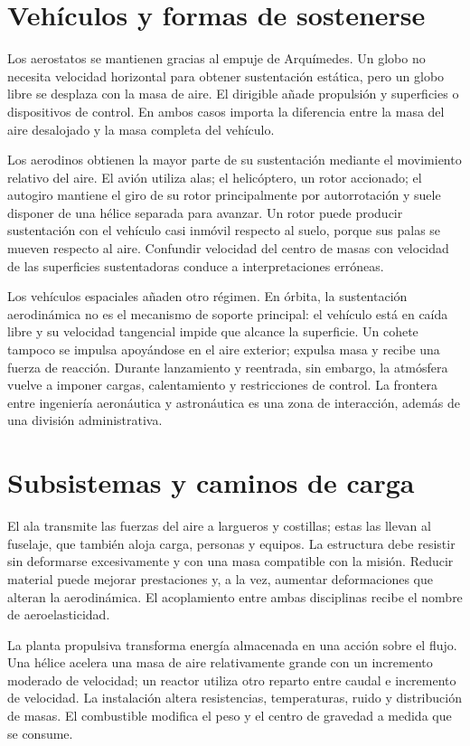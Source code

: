 \section{Vehículos y formas de sostenerse}
Los aerostatos se mantienen gracias al empuje de Arquímedes. Un globo no necesita velocidad horizontal para obtener sustentación estática, pero un globo libre se desplaza con la masa de aire. El dirigible añade propulsión y superficies o dispositivos de control. En ambos casos importa la diferencia entre la masa del aire desalojado y la masa completa del vehículo.

Los aerodinos obtienen la mayor parte de su sustentación mediante el movimiento relativo del aire. El avión utiliza alas; el helicóptero, un rotor accionado; el autogiro mantiene el giro de su rotor principalmente por autorrotación y suele disponer de una hélice separada para avanzar. Un rotor puede producir sustentación con el vehículo casi inmóvil respecto al suelo, porque sus palas se mueven respecto al aire. Confundir velocidad del centro de masas con velocidad de las superficies sustentadoras conduce a interpretaciones erróneas.

Los vehículos espaciales añaden otro régimen. En órbita, la sustentación aerodinámica no es el mecanismo de soporte principal: el vehículo está en caída libre y su velocidad tangencial impide que alcance la superficie. Un cohete tampoco se impulsa apoyándose en el aire exterior; expulsa masa y recibe una fuerza de reacción. Durante lanzamiento y reentrada, sin embargo, la atmósfera vuelve a imponer cargas, calentamiento y restricciones de control. La frontera entre ingeniería aeronáutica y astronáutica es una zona de interacción, además de una división administrativa.

\section{Subsistemas y caminos de carga}
El ala transmite las fuerzas del aire a largueros y costillas; estas las llevan al fuselaje, que también aloja carga, personas y equipos. La estructura debe resistir sin deformarse excesivamente y con una masa compatible con la misión. Reducir material puede mejorar prestaciones y, a la vez, aumentar deformaciones que alteran la aerodinámica. El acoplamiento entre ambas disciplinas recibe el nombre de aeroelasticidad.

La planta propulsiva transforma energía almacenada en una acción sobre el flujo. Una hélice acelera una masa de aire relativamente grande con un incremento moderado de velocidad; un reactor utiliza otro reparto entre caudal e incremento de velocidad. La instalación altera resistencias, temperaturas, ruido y distribución de masas. El combustible modifica el peso y el centro de gravedad a medida que se consume.

